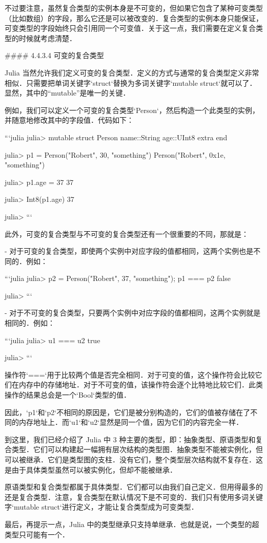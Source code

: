 不过要注意，虽然复合类型的实例本身是不可变的，但如果它包含了某种可变类型（比如数组）的字段，那么它还是可以被改变的．复合类型的实例本身只能保证，可变类型的字段始终只会引用同一个可变值．关于这一点，我们需要在定义复合类型的时候就考虑清楚．

#### 4.4.3.4 可变的复合类型

Julia 当然允许我们定义可变的复合类型．定义的方式与通常的复合类型定义非常相似．只需要把单词关键字`struct`替换为多词关键字`mutable struct`就可以了．显然，其中的“mutable”是唯一的关键．

例如，我们可以定义一个可变的复合类型`Person`，然后构造一个此类型的实例，并随意地修改其中的字段值．代码如下：

```julia
julia> mutable struct Person
           name::String
           age::UInt8
           extra
       end

julia> p1 = Person("Robert", 30, "something")
Person("Robert", 0x1e, "something")

julia> p1.age = 37
37

julia> Int8(p1.age)
37

julia> 
```

此外，可变的复合类型与不可变的复合类型还有一个很重要的不同，那就是：

- 对于可变的复合类型，即使两个实例中对应字段的值都相同，这两个实例也是不同的．例如：

  ```julia
  julia> p2 = Person("Robert", 37, "something"); p1 === p2
  false
  
  julia> 
  ```

- 对于不可变的复合类型，只要两个实例中对应字段的值都相同，这两个实例就是相同的．例如：

  ```julia
  julia> u1 === u2
  true
  
  julia> 
  ```

操作符`===`用于比较两个值是否完全相同．对于可变的值，这个操作符会比较它们在内存中的存储地址．对于不可变的值，该操作符会逐个比特地比较它们．此类操作的结果总会是一个`Bool`类型的值．

因此，`p1`和`p2`不相同的原因是，它们是被分别构造的，它们的值被存储在了不同的内存地址上．而`u1`和`u2`显然是同一个值，因为它们的内容完全一样．

到这里，我们已经介绍了 Julia 中 3 种主要的类型，即：抽象类型、原语类型和复合类型．它们可以构建起一幅拥有层次结构的类型图．抽象类型不能被实例化，但可以被继承．它们是类型图的支柱．没有它们，整个类型层次结构就不复存在．这是由于具体类型虽然可以被实例化，但却不能被继承．

原语类型和复合类型都属于具体类型．它们都可以由我们自己定义．但用得最多的还是复合类型．注意，复合类型在默认情况下是不可变的．我们只有使用多词关键字`mutable struct`进行定义，才能让复合类型成为可变类型．

最后，再提示一点，Julia 中的类型继承只支持单继承．也就是说，一个类型的超类型只可能有一个．